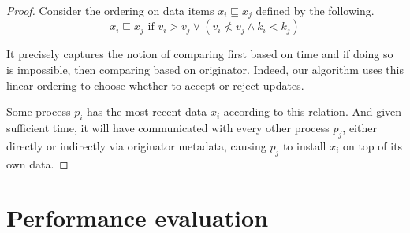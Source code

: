 \documentclass{article}
\begin{document}
\begin{proof}
    Consider the ordering on data items $x_i \sqsubseteq x_j$ defined by the
    following.
    $$
    x_i \sqsubseteq x_j
    \text{ if }
    v_i > v_j \lor (v_i \nless v_j \land k_i < k_j)
    $$

    It precisely captures the notion of comparing first based on time and if
    doing so is impossible, then comparing based on originator. Indeed, our
    algorithm uses this linear ordering to choose whether to accept or reject
    updates.

    Some process $p_i$ has the most recent data $x_i$ according to this
    relation. And given sufficient time, it will have communicated with every
    other process $p_j$, either directly or indirectly via originator metadata,
    causing $p_j$ to install $x_i$ on top of its own data.
\end{proof}

\section{Performance evaluation}
\end{document}
